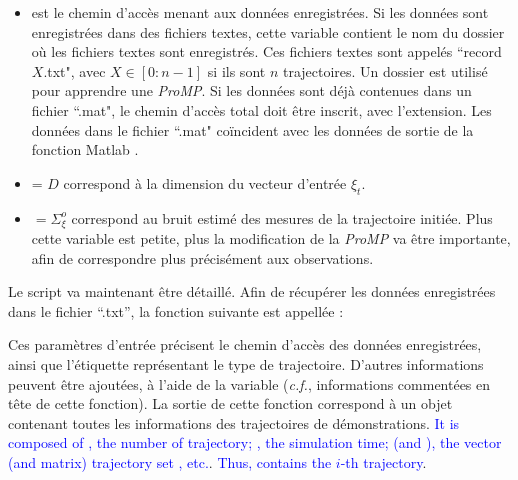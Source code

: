 \documentclass[utf8]{frontiersSCNS} %
\newcommand{\rev}[1]{\textcolor{blue}{#1}}
\begin{document}
\begin{itemize}
\item {} est le chemin d'accès menant aux données enregistrées. Si les données sont enregistrées dans des fichiers textes, cette variable contient le nom du dossier où les fichiers textes sont enregistrés. Ces fichiers textes sont appelés ``record$X$.txt", avec $X \in [0:n-1]$ si ils sont $n$ trajectoires. Un dossier est utilisé pour apprendre une \textit{ProMP}. Si les données sont déjà contenues dans un fichier ``.mat", le chemin d'accès total doit être inscrit, avec l'extension. Les données dans le fichier ``.mat" coïncident avec les données de sortie de la fonction Matlab . %
\item {}= $D$ correspond à la dimension du vecteur d'entrée $\xi_t$. 
\item {} $= \Sigma^o_\xi$ correspond au bruit estimé des mesures de la trajectoire initiée. Plus cette variable est petite, plus la modification de la \textit{ProMP} va être importante, afin de correspondre plus précisément aux observations.
\end{itemize}

Le script va maintenant être détaillé. Afin de récupérer les données enregistrées dans le fichier ``.txt'', la fonction suivante est appellée :


Ces paramètres d'entrée précisent le chemin d'accès des données enregistrées, ainsi que l'étiquette représentant le type de trajectoire. D'autres informations peuvent être ajoutées, à l'aide de la variable  (\textit{c.f.}, informations commentées en tête de cette fonction). 
La sortie de cette fonction correspond à un objet contenant toutes les informations des trajectoires de démonstrations. \rev{It is composed of , the number of trajectory; \mcode{realTime}, the simulation time; \mcode{y} (and \mcode{yMat}), the vector (and matrix) trajectory set , etc.}. 
\rev{Thus,  contains the $i$-th trajectory}.
\end{document}
